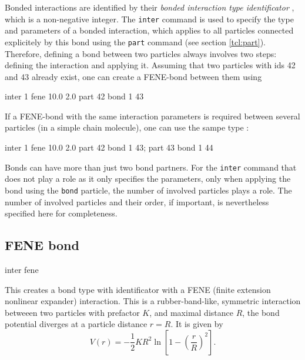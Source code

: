  Bonded interactions are identified by their
\emph{bonded interaction type identificator} , which is a
non-negative integer.  The \texttt{inter}  command is used
to specify the type and parameters of a bonded interaction, which applies to all
particles connected explicitely by this bond using the \texttt{part} command
(see section \vref{tcl:part}).  Therefore, defining a bond between two particles
always involves two steps: defining the interaction and applying it. Assuming
that two particles with ids 42 and 43 already exist, one can create \eg a
FENE-bond between them using
\begin{tclcode}
  inter 1 fene 10.0 2.0
  part 42 bond 1 43
\end{tclcode}
If a FENE-bond with the same interaction parameters is required between several
particles (\eg in a simple chain molecule), one can use the sampe type :
\begin{tclcode}
  inter 1 fene 10.0 2.0
  part 42 bond 1 43; part 43 bond 1 44 
\end{tclcode}

Bonds can have more than just two bond partners. For the \texttt{inter} command
that does not play a role as it only specifies the parameters, only when
applying the bond using the \texttt{bond} particle, the number of involved
particles plays a role. The number of involved particles and their order, if
important, is nevertheless specified here for completeness.

\subsection{FENE bond}

\begin{essyntax}
  inter 
  fene
   
\end{essyntax}
This creates a bond type with identificator  with a FENE
(finite extension nonlinear expander) interaction. This is a rubber-band-like,
symmetric interaction betweeen two particles with prefactor $K$, and maximal
distance $R$, \ie the bond potential diverges at a particle distance $r=R$. It
is given by
\begin{equation}
  V(r) = -\frac{1}{2} K R^2\ln \left[ 1 - \left( \frac{r}{R} \right)^2 \right].
\end{equation}

